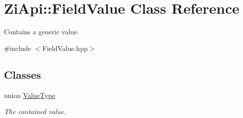 \hypertarget{classZiApi_1_1FieldValue}{}\section{Zi\+Api\+::Field\+Value Class Reference}
\label{classZiApi_1_1FieldValue}


Contains a generic value.  




{\ttfamily \#include $<$Field\+Value.\+hpp$>$}

\subsection*{Classes}
\begin{DoxyCompactItemize}
\item 
union \mbox{\hyperlink{unionZiApi_1_1FieldValue_1_1ValueType}{Value\+Type}}
\begin{DoxyCompactList}\small\item\em The contained value. \end{DoxyCompactList}\end{DoxyCompactItemize}

